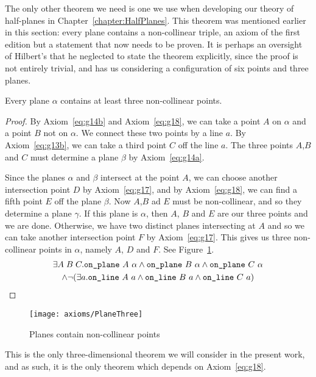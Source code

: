 The only other theorem we need is one we use when developing our theory of half-planes in Chapter~\ref{chapter:HalfPlanes}. This theorem was mentioned earlier in this section: every plane contains a non-collinear triple, an axiom of the first edition but a statement that now needs to be proven. It is perhaps an oversight of Hilbert's that he neglected to state the theorem explicitly, since the proof is not entirely trivial, and has us considering a configuration of six points and three planes.

\label{sec:PlaneThree}
\begin{theorem}\label{eq:PlaneThree}
Every plane $\alpha$ contains at least three non-collinear points.
\end{theorem}
\begin{proof}
By Axiom~\ref{eq:g14b} and Axiom~\ref{eq:g18}, we can take a point $A$ on $\alpha$ and a point $B$ not on $\alpha$. We connect these two points by a line $a$. By Axiom~\ref{eq:g13b}, we can take a third point $C$ off the line $a$. The three points $A$,$B$ and $C$ must determine a plane $\beta$ by Axiom~\ref{eq:g14a}.

Since the planes $\alpha$ and $\beta$ intersect at the point $A$, we can choose another intersection point $D$ by Axiom~\ref{eq:g17}, and by Axiom~\ref{eq:g18}, we can find a fifth point $E$ off the plane $\beta$. Now $A$,$B$ ad $E$ must be non-collinear, and so they determine a plane $\gamma$. If this plane is $\alpha$, then $A$, $B$ and $E$ are our three points and we are done. Otherwise, we have two distinct planes intersecting at $A$ and so we can take another intersection point $F$ by Axiom~\ref{eq:g17}. This gives us three non-collinear points in $\alpha$, namely $A$, $D$ and $F$. See Figure~\ref{fig:PlaneThree}.
\begin{multline}
\exists A\;B\;C. \code{on\_plane}\ A\ \alpha \wedge \code{on\_plane}\ B\ \alpha \wedge \code{on\_plane}\ C\ \alpha\\
\wedge\Triangle{a}{A}{B}{C}
\end{multline}
\end{proof}
\begin{figure}
\centering\texttt{[image: axioms/PlaneThree]}
\caption{Planes contain non-collinear points}
\label{fig:PlaneThree}
\end{figure}

This is the only three-dimensional theorem we will consider in the present work, and as such, it is the only theorem which depends on Axiom~\ref{eq:g18}.

